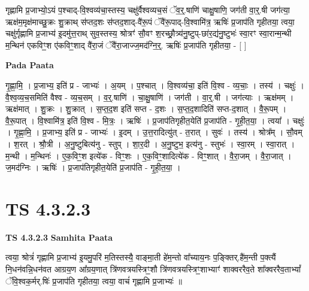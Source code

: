 \documentclass[17pt]{extarticle}
\begin{document}
गृह्णामि प्र॒जाभ्यो॒ऽयं प॒श्चाद्-वि॒श्वव्य॑चा॒स्तस्य॒ चक्षु॑र्वैश्वव्यच॒सं ॅव॒र्॒.षाणि॑ चाक्षु॒षाणि॒ जग॑ती वा॒र्॒.षी जग॑त्या॒ ऋक्ष॑म॒मृक्ष॑माच्छु॒क्रः शु॒क्राथ् स॑प्तद॒शः स॑प्तद॒शाद्-वै॑रू॒पं ॅवै॑रू॒पाद्-वि॒श्वामि॑त्र॒ ऋषिः॑ प्र॒जाप॑ति गृहीतया॒ त्वया॒ चक्षु॑र्गृह्णामि प्र॒जाभ्य॑ इ॒दमु॑त्त॒राथ् सुव॒स्तस्य॒ श्रोत्रꣳ॑ सौ॒वꣳ श॒रच्छ्रौ॒त्र्य॑नु॒ष्टुप्-छा॑र॒द्य॑नु॒ष्टुभः॑ स्वा॒रꣳ स्वा॒रान्म॒न्थी म॒न्थिन॑ एकविꣳ॒॒श ए॑कविꣳ॒॒शाद् वै॑रा॒जं ॅवै॑रा॒जाज्ज॒मद॑ग्नि॒र्॒. ऋषिः॑ प्र॒जाप॑ति गृहीतया॒ - [  ] \newline

\textbf{Pada Paata} \newline

गृ॒ह्णा॒मि॒ । प्र॒जाभ्य॒ इति॑ प्र - जाभ्यः॑ । अ॒यम् । प॒श्चात् । वि॒श्वव्य॑चा॒ इति॑ वि॒श्व - व्य॒चाः॒ । तस्य॑ । चक्षुः॑ । वै॒श्व॒व्य॒च॒समिति॑ वैश्व - व्य॒च॒सम् । व॒र्॒.षाणि॑ । चा॒क्षु॒षाणि॑ । जग॑ती । वा॒र्॒.षी । जग॑त्याः । ऋक्ष॑मम् । ऋक्ष॑मात् । शु॒क्रः । शु॒क्रात् । स॒प्त॒द॒श इति॑ सप्त - द॒शः । स॒प्त॒द॒शादिति॑ सप्त-द॒शात् । वै॒रू॒पम् । वै॒रू॒पात् । वि॒श्वामि॑त्र॒ इति॑ वि॒श्व - मि॒त्रः॒ । ऋषिः॑ । प्र॒जाप॑तिगृहीत॒येति॑ प्र॒जाप॑ति - गृ॒ही॒त॒या॒ । त्वया᳚ । चक्षुः॑ । गृ॒ह्णा॒मि॒ । प्र॒जाभ्य॒ इति॑ प्र - जाभ्यः॑ । इ॒दम् । उ॒त्त॒रादित्यु॑त् - त॒रात् । सुवः॑ । तस्य॑ । श्रोत्र᳚म् । सौ॒वम् । श॒रत् । श्रौ॒त्री । अ॒नु॒ष्टुबित्य॑नु - स्तुप् । शा॒र॒दी । अ॒नु॒ष्टुभ॒ इत्य॑नु - स्तुभः॑ । स्वा॒रम् । स्वा॒रात् । म॒न्थी । म॒न्थिनः॑ । ए॒क॒विꣳ॒॒श इत्ये॑क - विꣳ॒॒शः । ए॒क॒विꣳ॒॒शादित्ये॑क - विꣳ॒॒शात् । वै॒रा॒जम् । वै॒रा॒जात् । ज॒मद॑ग्निः । ऋषिः॑ । प्र॒जाप॑तिगृहीत॒येति॑ प्र॒जाप॑ति - गृ॒ही॒त॒या॒ ।  \newline





\section{ TS 4.3.2.3 }

\textbf{TS 4.3.2.3 } \newline
\textbf{Samhita Paata} \newline

त्वया॒ श्रोत्रं॑ गृह्णामि प्र॒जाभ्य॑ इ॒यमु॒परि॑ म॒तिस्तस्यै॒ वाङ्मा॒ती हे॑म॒न्तो वा᳚च्याय॒नः प॒ङ्क्तिर्.है॑म॒न्ती प॒क्त्यैं नि॒धन॑वन्नि॒धन॑वत आग्रय॒ण आ᳚ग्रय॒णात् त्रि॑णवत्रयस्त्रिꣳ॒॒शौ त्रि॑णवत्रयस्त्रिꣳ॒॒शाभ्याꣳ॑ शाक्वररैव॒ते शा᳚क्वररैव॒ताभ्यां᳚ ॅवि॒श्वक॒र्मर्.षिः॑ प्र॒जाप॑ति गृहीतया॒ त्वया॒ वाचं॑ गृह्णामि प्र॒जाभ्यः॑ ॥ \newline
\end{document}
